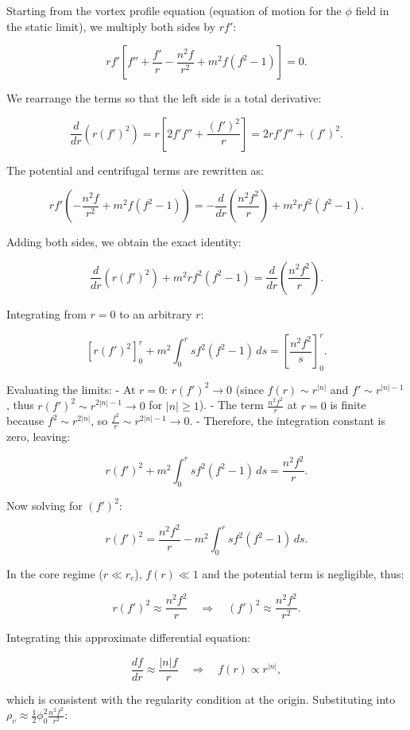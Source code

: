 \documentclass[11pt,a4paper]{article}
\begin{document}
Starting from the vortex profile equation (equation of motion for the $\phi$ field in the static limit), we multiply both sides by $r f'$:

\[
r f' \left[ f'' + \frac{f'}{r} - \frac{n^2 f}{r^2} + m^2 f (f^2 - 1) \right] = 0.
\]

We rearrange the terms so that the left side is a total derivative:

\[
\frac{d}{dr}\left( r (f')^2 \right) = r \left[ 2 f' f'' + \frac{(f')^2}{r} \right] = 2 r f' f'' + (f')^2.
\]

The potential and centrifugal terms are rewritten as:

\[
r f' \left( -\frac{n^2 f}{r^2} + m^2 f (f^2 - 1) \right) = - \frac{d}{dr}\left( \frac{n^2 f^2}{r} \right) + m^2 r f^2 (f^2 - 1).
\]

Adding both sides, we obtain the exact identity:

\begin{equation}
	\frac{d}{dr}\left( r (f')^2 \right) + m^2 r f^2 (f^2 - 1) = \frac{d}{dr}\left( \frac{n^2 f^2}{r} \right).
\end{equation}

Integrating from $r=0$ to an arbitrary $r$:

\[
\left[ r (f')^2 \right]_0^r + m^2 \int_0^r s f^2 (f^2 - 1)\, ds = \left[ \frac{n^2 f^2}{s} \right]_0^r .
\]

Evaluating the limits:
- At $r=0$: $r (f')^2 \to 0$ (since $f(r) \sim r^{|n|}$ and $f' \sim r^{|n|-1}$, thus $r (f')^2 \sim r^{2|n|-1} \to 0$ for $|n|\geq 1$).
- The term $\frac{n^2 f^2}{r}$ at $r=0$ is finite because $f^2 \sim r^{2|n|}$, so $\frac{f^2}{r} \sim r^{2|n|-1} \to 0$.
- Therefore, the integration constant is zero, leaving:

\[
r (f')^2 + m^2 \int_0^r s f^2 (f^2 - 1)\, ds = \frac{n^2 f^2}{r}.
\]

Now solving for $(f')^2$:

\[
r (f')^2 = \frac{n^2 f^2}{r} - m^2 \int_0^r s f^2 (f^2 - 1)\, ds.
\]

In the core regime ($r \ll r_c$), $f(r) \ll 1$ and the potential term is negligible, thus:

\[
r (f')^2 \approx \frac{n^2 f^2}{r} \quad \Rightarrow \quad (f')^2 \approx \frac{n^2 f^2}{r^2}.
\]

Integrating this approximate differential equation:

\[
\frac{df}{dr} \approx \frac{|n| f}{r} \quad \Rightarrow \quad f(r) \propto r^{|n|},
\]

which is consistent with the regularity condition at the origin. Substituting into $\rho_v \approx \frac{1}{2} \phi_0^2 \frac{n^2 f^2}{r^2}$:
\end{document}
